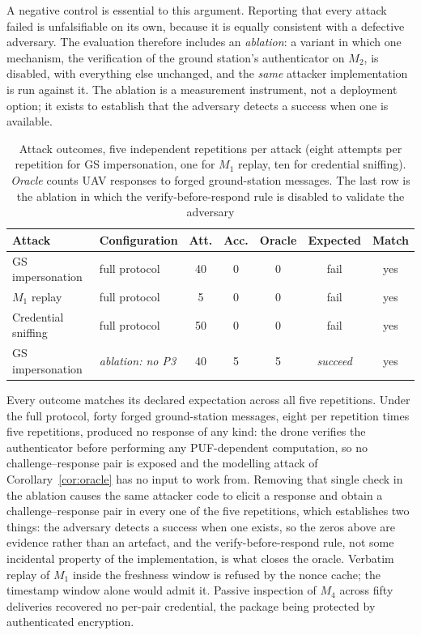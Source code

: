 \documentclass[journal]{IEEEtran}
\begin{document}
A negative control is essential to this argument. Reporting that every attack
failed is unfalsifiable on its own, because it is equally consistent with a
defective adversary. The evaluation therefore includes an \emph{ablation}: a
variant in which one mechanism, the verification of the ground station's
authenticator on $M_2$, is disabled, with everything else unchanged, and the
\emph{same} attacker implementation is run against it. The ablation is a
measurement instrument, not a deployment option; it exists to establish that
the adversary detects a success when one is available.

\begin{table}[H]
\centering
\caption{Attack outcomes, five independent repetitions per attack (eight
attempts per repetition for GS impersonation, one for $M_1$ replay, ten for
credential sniffing). \emph{Oracle} counts UAV responses to forged ground-station
messages. The last row is the ablation in which the verify-before-respond rule
is disabled to validate the adversary}
\label{tab:attacks}
\scriptsize
\setlength{\tabcolsep}{2.4pt}
\begin{tabular}{@{}llccccc@{}}
\toprule
\textbf{Attack} & \textbf{Configuration} & \textbf{Att.} & \textbf{Acc.} &
\textbf{Oracle} & \textbf{Expected} & \textbf{Match} \\
\midrule
GS impersonation & full protocol & 40 & 0 & 0 & fail & yes \\
$M_1$ replay & full protocol & 5 & 0 & 0 & fail & yes \\
Credential sniffing & full protocol & 50 & 0 & 0 & fail & yes \\
\midrule
GS impersonation & \emph{ablation: no P3} & 40 & 5 & 5 & \emph{succeed} & yes \\
\bottomrule
\end{tabular}
\end{table}

Every outcome matches its declared expectation across all five repetitions.
Under the full protocol, forty forged ground-station messages, eight per
repetition times five repetitions, produced no response of any kind: the drone
verifies the authenticator before performing any PUF-dependent computation, so
no challenge--response pair is exposed and the modelling attack of
Corollary~\ref{cor:oracle} has no input to work from. Removing that single
check in the ablation causes the same attacker code to elicit a response and
obtain a challenge--response pair in every one of the five repetitions, which
establishes two things: the adversary detects a success when one exists, so the
zeros above are evidence rather than an artefact, and the verify-before-respond
rule, not some incidental property of the implementation, is what closes the
oracle. Verbatim replay of $M_1$ inside the freshness window is refused by the
nonce cache; the timestamp window alone would admit it. Passive inspection of
$M_4$ across fifty deliveries recovered no per-pair credential, the package
being protected by authenticated encryption.
\end{document}
